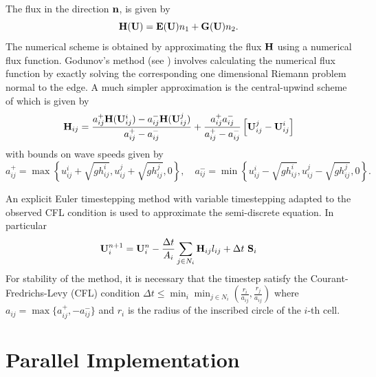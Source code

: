 \documentclass{manual}
\begin{document}
The flux in the direction $\mathbf{n}$, is given by 
\[
\mathbf{H}(\mathbf{U})  = \mathbf{E}(\mathbf{U}) n_1 + \mathbf{G}(\mathbf{U}) n_2 .
\]
The numerical scheme is obtained by approximating the flux $\mathbf{H}$ using a numerical flux function. 
Godunov's method (see \cite{Toro1992}) involves calculating the
numerical flux function by exactly
solving the corresponding one dimensional Riemann problem normal to
the edge. A much simpler approximation is the  central-upwind scheme 
of \cite{KurNP2001} which is given by
\[
\mathbf{H}_{ij} = \frac{a^+_{ij}  \mathbf{H}(\mathbf{U}^i_{ij}) - a^-_{ij}\mathbf{H}(\mathbf{U}^j_{ij}) }
{a^+_{ij} - a^-_{ij}} 
+ \frac{a^+_{ij}  a^-_{ij}} {a^+_{ij} - a^-_{ij}} \left[ \mathbf{U}^j_{ij} - \mathbf{U}^i_{ij}\right]
\]
with bounds on wave speeds given by
\[
a_{ij}^+ = \max \left\{ u_{ij}^i + \sqrt{g h_{ij}^i},  u_{ij}^j + \sqrt{g h_{ij}^j}, 0 \right\}, \quad
a_{ij}^- = \min \left\{ u_{ij}^i - \sqrt{g h_{ij}^i},  u_{ij}^j - \sqrt{g h_{ij}^j}, 0 \right\} .
\]

An explicit Euler
timestepping method with variable timestepping adapted to the
observed CFL condition is used to approximate the semi-discrete equation. In particular
\[
 \UU^{n+1}_i =  \UU^n_i -  \frac{\Delta t}{A_i}\sum\limits_{j\in N_i} \HH_{ij} l_{ij}  +  \Delta t\ \SSS_i
\]
For stability of the method, it is necessary that the timestep satisfy the Courant-Fredrichs-Levy (CFL) condition
$
  \Delta t \le \min_{i}  \min_{j\in N_i} \left( \frac{r_i}{a_{ij}}, \frac{r_j}{a_{ij}} \right )
$
where $a_{ij} = \max \{ a_{ij}^+, -a_{ij}^- \} $ and $r_i$  is the radius  of the inscribed circle of the $i$-th cell. 


\section{Parallel Implementation}
\label{theory:parallel}
\end{document}

